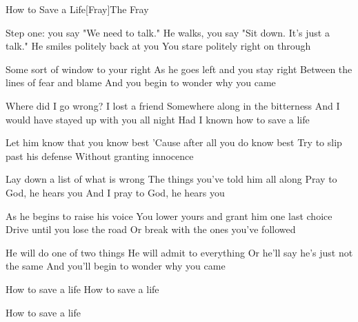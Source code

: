 \begin{Song}{How to Save a Life}[Fray]{The Fray}
\begin{multicols}{2}
\begin{Verse}
Step one: you say "We need to talk."
He walks, you say "Sit down. It's just a talk."
He smiles politely back at you
You stare politely right on through
\espaceInterStrophe

Some sort of window to your right
As he goes left and you stay right
Between the lines of fear and blame
And you begin to wonder why you came
\end{Verse}
\espaceInterStrophe

\begin{Chorus}
Where did I go wrong? I lost a friend
Somewhere along in the bitterness
And I would have stayed up with you all night
Had I known how to save a life
\end{Chorus}
\espaceInterStrophe

\begin{Verse}
Let him know that you know best
'Cause after all you do know best
Try to slip past his defense
Without granting innocence
\espaceInterStrophe

Lay down a list of what is wrong
The things you've told him all along
Pray to God, he hears you
And I pray to God, he hears you
\end{Verse}
\vfill
\columnbreak

\tochorus
\espaceInterStrophe

\begin{Verse}
As he begins to raise his voice
You lower yours and grant him one last choice
Drive until you lose the road
Or break with the ones you've followed
\espaceInterStrophe

He will do one of two things
He will admit to everything
Or he'll say he's just not the same
And you'll begin to wonder why you came
\end{Verse}
\espaceInterStrophe

\tochorus[x2]
\espaceInterStrophe

\begin{Chorus}
How to save a life
How to save a life
\end{Chorus}
\espaceInterStrophe

\tochorus[x2]
\espaceInterStrophe

\begin{Chorus}
How to save a life
\end{Chorus}
\vfill
~
\end{multicols}


\end{Song}
